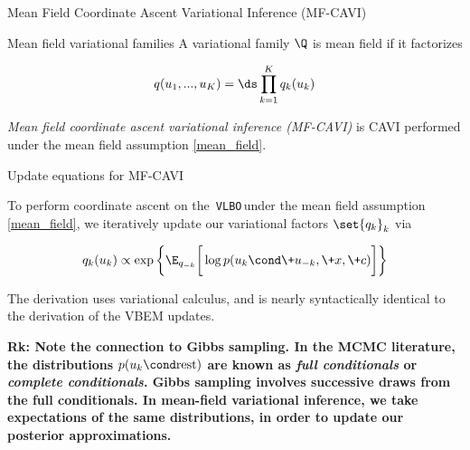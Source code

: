 \documentclass[10pt]{beamer}
\newcommand{\VLBO}{\,\texttt{VLBO}\,}
\begin{document}
\begin{frame}{Mean Field Coordinate Ascent Variational Inference (MF-CAVI)}

\begin{block}{Mean field variational families}
A variational family $\Q$ is mean field if it factorizes 

\begin{equation} \label{mean_field}
q(u_1, ..., u_K) = \ds\prod_{k=1}^K q_k(u_k)
\end{equation}
\end{block}

\textit{Mean field coordinate ascent variational inference (MF-CAVI)} is CAVI performed under the mean field assumption \eqref{mean_field}. 
   
\end{frame}

\begin{frame}{Update equations for MF-CAVI}

To perform coordinate ascent on the \VLBO under the mean field assumption \eqref{mean_field}, we iteratively update our variational factors $\set{q_k}_k$ via 
 
\begin{equation} \label{mfcavi_update}
q_k(u_k) \propto \exp \bigg\{ \E_{q_{-k}} \bigg[  \log p(u_k \cond \+u_{-k}, \+x, \+c)\bigg] \bigg\}
\end{equation}

The derivation uses variational calculus, and is nearly syntactically identical to the derivation of the VBEM updates. 




\vfill \vfill \vfill \vfill \vfill \vfill
\pause \tiny \bf{Rk:} Note the connection to Gibbs sampling.  In the MCMC literature, the distributions $ p(u_k \cond \text{rest} )$ are known as \textit{full conditionals} or \textit{complete conditionals}.  Gibbs sampling involves successive draws from the full conditionals.  In mean-field variational inference, we take expectations of the same distributions, in order to update our posterior approximations.  
\end{frame}
\end{document}
